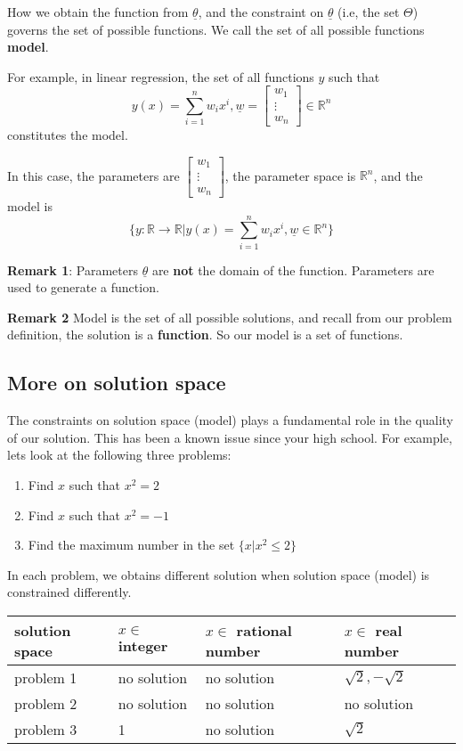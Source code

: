 How we obtain the function from $\underline{\theta}$, and the constraint on $\underline{\theta}$ (i.e, the set $\Theta$) governs the set of possible functions. We call the set of all possible functions \textbf{model}.

For example, in linear regression, the set of all functions $y$ such that
$$y(x) = \sum_{i=1}^n w_i x^i, \underline{w} = \begin{bmatrix} w_1 \\ \vdots \\ w_n \end{bmatrix} \in \mathbb{R}^n$$
constitutes the model. 

In this case, the parameters are $\begin{bmatrix} w_1 \\ \vdots \\ w_n \end{bmatrix}$, the parameter space is $\mathbb{R}^n$, and the model is
$$\Big\{ y: \mathbb{R} \to \mathbb{R} \Big| y(x) = \sum_{i=1}^n w_i x^i, \underline{w} \in \mathbb{R}^n \Big\}$$

\textbf{Remark 1}: Parameters $\underline{\theta}$ are \textbf{not} the domain of the function. Parameters are used to generate a function.

\textbf{Remark 2} Model is the set of all possible solutions, and recall from our problem definition, the solution is a \textbf{function}. So our model is a set of functions.

\subsection{More on solution space}
The constraints on solution space (model) plays a fundamental role in the quality of our solution. This has been a known issue since your high school. For example, lets look at the following three problems:
\begin{enumerate}
\item Find $x$ such that $x^2 = 2$
\item Find $x$ such that $x^2 = -1$
\item Find the maximum number in the set $\{ x | x^2 \leq 2 \}$
\end{enumerate}

In each problem, we obtains different solution when solution space (model) is constrained differently.

\begin{center}
    \begin{tabular}{| l | l | l | l |}
    \hline
    solution space & $x \in $ integer & $x \in $ rational number & $x \in $ real number \\ \hline
    problem 1 & no solution & no solution & $\sqrt{2}, -\sqrt{2}$ \\ \hline
    problem 2 & no solution & no solution & no solution \\ \hline
    problem 3 & 1 & no solution & $\sqrt{2}$ \\
    \hline
    \end{tabular}
\end{center}

